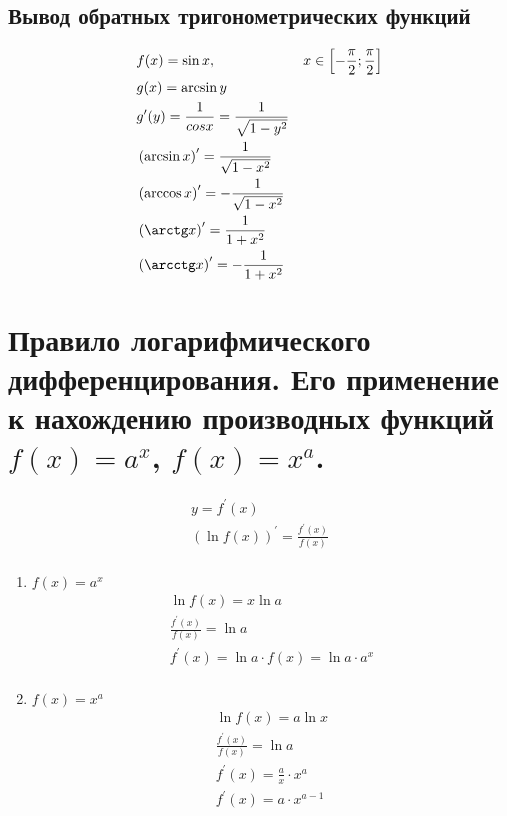 \documentclass[12pt, fleqn]{article}
\begin{document}
\subsection{Вывод обратных тригонометрических функций}
\begin{align*}
	&f(x)=\sin x, &x\in\left[-\frac{\pi}{2};\frac{\pi}{2}\right]\\
	&g(x)=\arcsin y\\
	&g^\prime(y)=\frac{1}{cos x}=\frac{1}{\sqrt{1-y^2}}\\
	&\left(\arcsin x\right)^\prime = \frac{1}{\sqrt{1-x^2}}\\
	&\left(\arccos x\right)^\prime = -\frac{1}{\sqrt{1-x^2}}\\
	&\left(\arctg x\right)^\prime = \frac{1}{1+x^2}\\
	&\left(\arcctg x\right)^\prime = -\frac{1}{1+x^2}\\
\end{align*}
\section{Правило логарифмического дифференцирования. Его применение к нахождению производных функций  $f(x)=a^x$,   $f(x)=x^a$.}
\begin{multline*}
	y=f^\prime(x)\\
	\left(\ln f(x)\right)^\prime = \frac{f^\prime (x)}{f(x)}\\
\end{multline*}
\begin{enumerate}
	\item $f(x)=a^x$
	\begin{multline*}
		\ln f(x)=x \ln a\\
		\frac{f^\prime(x)}{f(x)}=\ln a\\
		f^\prime(x)=\ln a\cdot f(x)= \ln a\cdot a^x\\
	\end{multline*}
	\item $f(x)=x^a$
	\begin{multline*}
		\ln f(x) = a \ln x\\
		\frac{ f^\prime(x)}{f(x)}=\ln a\\
		f^\prime(x)=\frac{a}{x}\cdot x^a\\
		f^\prime(x) = a\cdot x^{a-1}\\
	\end{multline*}
\end{enumerate}
\end{document}
